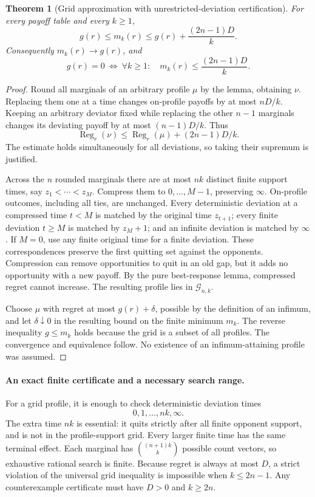 \documentclass[11pt,a4paper]{article}
\DeclareMathOperator{\Reg}{Reg}
\newtheorem{theorem}{Theorem}[section]
\theoremstyle{definition}
\theoremstyle{remark}
\begin{document}
\begin{theorem}[Grid approximation with unrestricted-deviation certification]
For every payoff table and every $k\geq1$,
\[
 \boxed{\quad g(r)\leq m_k(r)\leq g(r)+\frac{(2n-1)D}{k}.\quad}
\]
Consequently $m_k(r)\to g(r)$, and
\[
 g(r)=0\ \Longleftrightarrow\
 \forall k\geq1:\quad m_k(r)\leq\frac{(2n-1)D}{k}.
\]
\end{theorem}
\begin{proof}
Round all marginals of an arbitrary profile $\mu$ by the lemma, obtaining $\nu$. Replacing them one at a time changes on-profile payoffs by at most $nD/k$. Keeping an arbitrary deviator fixed while replacing the other $n-1$ marginals changes its deviating payoff by at most $(n-1)D/k$. Thus
\[
 \Reg_r(\nu)\leq\Reg_r(\mu)+(2n-1)D/k.
\]
The estimate holds simultaneously for all deviations, so taking their supremum is justified.

Across the $n$ rounded marginals there are at most $nk$ distinct finite support times, say $z_1<\cdots<z_M$. Compress them to $0,\ldots,M-1$, preserving $\infty$. On-profile outcomes, including all ties, are unchanged. Every deterministic deviation at a compressed time $t<M$ is matched by the original time $z_{t+1}$; every finite deviation $t\geq M$ is matched by $z_M+1$; and an infinite deviation is matched by $\infty$. If $M=0$, use any finite original time for a finite deviation. These correspondences preserve the first quitting set against the opponents. Compression can remove opportunities to quit in an old gap, but it adds no opportunity with a new payoff. By the pure best-response lemma, compressed regret cannot increase. The resulting profile lies in $\mathcal G_{n,k}$.

Choose $\mu$ with regret at most $g(r)+\delta$, possible by the definition of an infimum, and let $\delta\downarrow0$ in the resulting bound on the finite minimum $m_k$. The reverse inequality $g\leq m_k$ holds because the grid is a subset of all profiles. The convergence and equivalence follow. No existence of an infimum-attaining profile was assumed.
\end{proof}

\paragraph{An exact finite certificate and a necessary search range.}
For a grid profile, it is enough to check deterministic deviation times
\[
 0,1,\ldots,nk,\infty.
\]
The extra time $nk$ is essential: it quits strictly after all finite opponent support, and is not in the profile-support grid. Every larger finite time has the same terminal effect. Each marginal has $\binom{(n+1)k}{k}$ possible count vectors, so exhaustive rational search is finite. Because regret is always at most $D$, a strict violation of the universal grid inequality is impossible when $k\leq2n-1$. Any counterexample certificate must have $D>0$ and $k\geq2n$.
\end{document}
